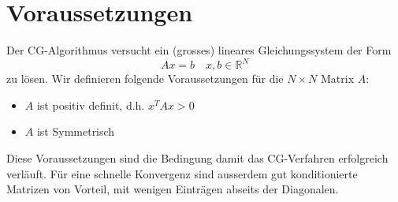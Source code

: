 \section{Voraussetzungen\label{cg:section:voraussetzungen}}

Der CG-Algorithmus versucht ein (grosses) lineares Gleichungssystem der Form
\begin{equation}
Ax = b \quad x, b \in \mathbb{R}^N
\end{equation}
zu lösen.
Wir definieren folgende Voraussetzungen für die $N\times N$ Matrix $A$:
\begin{itemize}
	\item $A$ ist positiv definit, d.h. $x^T A x > 0$
	\item $A$ ist Symmetrisch
\end{itemize}
Diese Voraussetzungen sind die Bedingung damit das CG-Verfahren erfolgreich verläuft.
Für eine schnelle Konvergenz sind ausserdem gut konditionierte Matrizen von Vorteil, mit wenigen Einträgen abseits der Diagonalen.